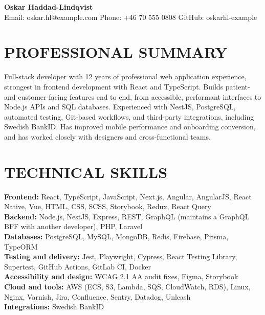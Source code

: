 \documentclass[11pt,a4paper]{article}
\begin{document}
\begin{center}
{\LARGE\bfseries\color{primarycolor} Oskar Haddad-Lindqvist}\\[0.35em]
Email: oskar.hl@example.com \textbar{} Phone: +46 70 555 0808 \textbar{} GitHub: oskarhl-example
\end{center}

\section*{PROFESSIONAL SUMMARY}
Full-stack developer with 12 years of professional web application experience, strongest in frontend development with React and TypeScript. Builds patient- and customer-facing features end to end, from accessible, performant interfaces to Node.js APIs and SQL databases. Experienced with NestJS, PostgreSQL, automated testing, Git-based workflows, and third-party integrations, including Swedish BankID. Has improved mobile performance and onboarding conversion, and has worked closely with designers and cross-functional teams.

\section*{TECHNICAL SKILLS}
\textbf{Frontend:} React, TypeScript, JavaScript, Next.js, Angular, AngularJS, React Native, Vue, HTML, CSS, SCSS, Storybook, Redux, React Query\\
\textbf{Backend:} Node.js, NestJS, Express, REST, GraphQL (maintains a GraphQL BFF with another developer), PHP, Laravel\\
\textbf{Databases:} PostgreSQL, MySQL, MongoDB, Redis, Firebase, Prisma, TypeORM\\
\textbf{Testing and delivery:} Jest, Playwright, Cypress, React Testing Library, Supertest, GitHub Actions, GitLab CI, Docker\\
\textbf{Accessibility and design:} WCAG 2.1 AA audit fixes, Figma, Storybook\\
\textbf{Cloud and tools:} AWS (ECS, S3, Lambda, SQS, CloudWatch, RDS), Linux, Nginx, Varnish, Jira, Confluence, Sentry, Datadog, Unleash\\
\textbf{Integrations:} Swedish BankID
\end{document}
